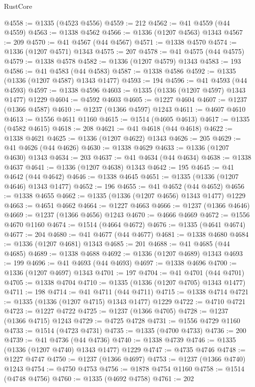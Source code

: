 \begin{lexlean}{RustCore}
\begin{coremodule}
@4558 := @1335 (@4523 @4556)
@4559 := 212
@4562 := @41 @4559 (@44 @4559)
@4563 := @1338 @4562
@4566 := @1336 (@1207 @4563) @1343
@4567 := 209
@4570 := @41 @4567 (@44 @4567)
@4571 := @1338 @4570
@4574 := @1336 (@1207 @4571) @1343
@4575 := 207
@4578 := @41 @4575 (@44 @4575)
@4579 := @1338 @4578
@4582 := @1336 (@1207 @4579) @1343
@4583 := 193
@4586 := @41 @4583 (@44 @4583)
@4587 := @1338 @4586
@4592 := @1335 (@1336 (@1207 @4587) @1343 @1477)
@4593 := 194
@4596 := @41 @4593 (@44 @4593)
@4597 := @1338 @4596
@4603 := @1335 (@1336 (@1207 @4597) @1343 @1477) @1229
@4604 := @4592 @4603
@4605 := @1227 @4604
@4607 := @1237 (@1366 @4587)
@4610 := @1237 (@1366 @4597) @1243
@4611 := @4607 @4610
@4613 := @1556 @4611 @1160
@4615 := @1514 (@4605 @4613)
@4617 := @1335 (@4582 @4615)
@4618 := 208
@4621 := @41 @4618 (@44 @4618)
@4622 := @1338 @4621
@4625 := @1336 (@1207 @4622) @1343
@4626 := 205
@4629 := @41 @4626 (@44 @4626)
@4630 := @1338 @4629
@4633 := @1336 (@1207 @4630) @1343
@4634 := 203
@4637 := @41 @4634 (@44 @4634)
@4638 := @1338 @4637
@4641 := @1336 (@1207 @4638) @1343
@4642 := 195
@4645 := @41 @4642 (@44 @4642)
@4646 := @1338 @4645
@4651 := @1335 (@1336 (@1207 @4646) @1343 @1477)
@4652 := 196
@4655 := @41 @4652 (@44 @4652)
@4656 := @1338 @4655
@4662 := @1335 (@1336 (@1207 @4656) @1343 @1477) @1229
@4663 := @4651 @4662
@4664 := @1227 @4663
@4666 := @1237 (@1366 @4646)
@4669 := @1237 (@1366 @4656) @1243
@4670 := @4666 @4669
@4672 := @1556 @4670 @1160
@4674 := @1514 (@4664 @4672)
@4676 := @1335 (@4641 @4674)
@4677 := 204
@4680 := @41 @4677 (@44 @4677)
@4681 := @1338 @4680
@4684 := @1336 (@1207 @4681) @1343
@4685 := 201
@4688 := @41 @4685 (@44 @4685)
@4689 := @1338 @4688
@4692 := @1336 (@1207 @4689) @1343
@4693 := 199
@4696 := @41 @4693 (@44 @4693)
@4697 := @1338 @4696
@4700 := @1336 (@1207 @4697) @1343
@4701 := 197
@4704 := @41 @4701 (@44 @4701)
@4705 := @1338 @4704
@4710 := @1335 (@1336 (@1207 @4705) @1343 @1477)
@4711 := 198
@4714 := @41 @4711 (@44 @4711)
@4715 := @1338 @4714
@4721 := @1335 (@1336 (@1207 @4715) @1343 @1477) @1229
@4722 := @4710 @4721
@4723 := @1227 @4722
@4725 := @1237 (@1366 @4705)
@4728 := @1237 (@1366 @4715) @1243
@4729 := @4725 @4728
@4731 := @1556 @4729 @1160
@4733 := @1514 (@4723 @4731)
@4735 := @1335 (@4700 @4733)
@4736 := 200
@4739 := @41 @4736 (@44 @4736)
@4740 := @1338 @4739
@4746 := @1335 (@1336 (@1207 @4740) @1343 @1477) @1229
@4747 := @4735 @4746
@4748 := @1227 @4747
@4750 := @1237 (@1366 @4697)
@4753 := @1237 (@1366 @4740) @1243
@4754 := @4750 @4753
@4756 := @1878 @4754 @1160
@4758 := @1514 (@4748 @4756)
@4760 := @1335 (@4692 @4758)
@4761 := 202

\end{coremodule}
\end{lexlean}
